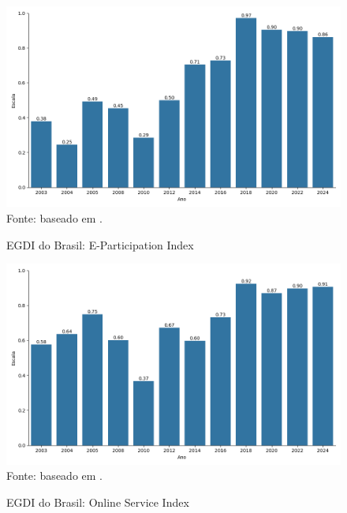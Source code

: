 \begin{figure}[H]
    \centering
    \caption{EGDI do Brasil: E-Participation Index}
    \includegraphics[width=1\linewidth]{figuras/egdi/egdi_brasil_epart.png}
    \label{fig:egdi_brasil_epart}
    \footnotesize{Fonte: baseado em \cite{ONU_edgi_mapa}.}
\end{figure}

\begin{figure}[H]
    \centering
    \caption{EGDI do Brasil: Online Service Index}
    \includegraphics[width=1\linewidth]{figuras/egdi/egdi_brasil_osi.png}
    \label{fig:egdi_brasil_osi}
    \footnotesize{Fonte: baseado em \cite{ONU_edgi_mapa}.}
\end{figure}

